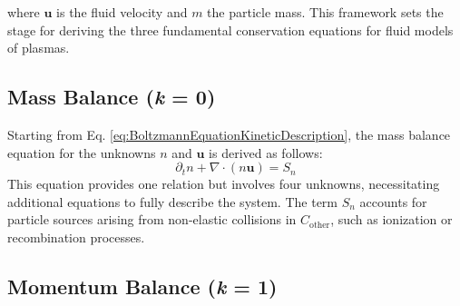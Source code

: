 where $\mathbf{u}$ is the fluid velocity and $m$ the particle mass. This framework sets the stage for deriving the three fundamental conservation equations for fluid models of plasmas.



\subsection{Mass Balance (\textit{k} = 0)}

Starting from Eq. \ref{eq:BoltzmannEquationKineticDescription}, the mass balance equation for the unknowns $n$ and $\mathbf{u}$ is derived as follows:
\begin{equation}
	\label{eq:ZeroMomentTransportEquation}
	\partial_t n + \nabla \cdot (n\mathbf{u}) = S_n
\end{equation}
This equation provides one relation but involves four unknowns, necessitating additional equations to fully describe the system. The term $S_n$ accounts for particle sources arising from non-elastic collisions in $C_{\text{other}}$, such as ionization or recombination processes.

\subsection{Momentum Balance (\textit{k} = 1)}

